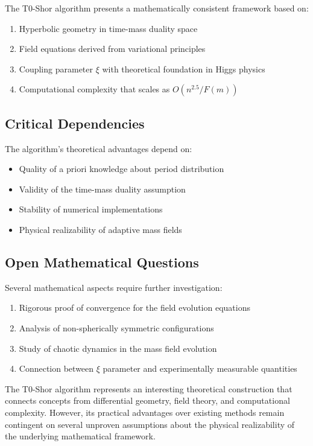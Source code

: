 \documentclass[12pt,a4paper]{article}
\begin{document}
	The T0-Shor algorithm presents a mathematically consistent framework based on:
	
	\begin{enumerate}
		\item Hyperbolic geometry in time-mass duality space
		\item Field equations derived from variational principles
		\item Coupling parameter $\xi$ with theoretical foundation in Higgs physics
		\item Computational complexity that scales as $O(n^{2.5}/F(m))$
	\end{enumerate}
	
	\subsection{Critical Dependencies}
	
	The algorithm's theoretical advantages depend on:
	
	\begin{itemize}
		\item Quality of a priori knowledge about period distribution
		\item Validity of the time-mass duality assumption
		\item Stability of numerical implementations
		\item Physical realizability of adaptive mass fields
	\end{itemize}
	
	\subsection{Open Mathematical Questions}
	
	Several mathematical aspects require further investigation:
	
	\begin{enumerate}
		\item Rigorous proof of convergence for the field evolution equations
		\item Analysis of non-spherically symmetric configurations
		\item Study of chaotic dynamics in the mass field evolution
		\item Connection between $\xi$ parameter and experimentally measurable quantities
	\end{enumerate}
	
	The T0-Shor algorithm represents an interesting theoretical construction that connects concepts from differential geometry, field theory, and computational complexity. However, its practical advantages over existing methods remain contingent on several unproven assumptions about the physical realizability of the underlying mathematical framework.
	
\end{document}
